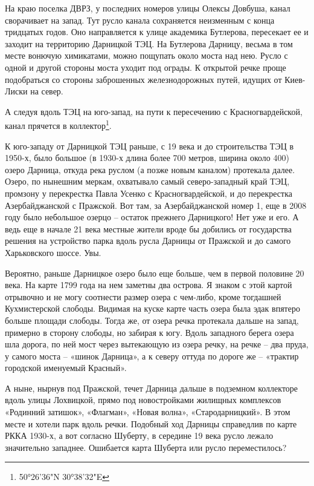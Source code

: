 
На краю поселка ДВРЗ, у последних номеров улицы Олексы Довбуша, канал сворачивает на запад. Тут русло канала сохраняется неизменным с конца тридцатых годов. Оно направляется к улице академика Бутлерова, пересекает ее и заходит на территорию Дарницкой ТЭЦ. На Бутлерова Дарницу, весьма в том месте вонючую химикатами, можно пощупать около моста над нею. Русло с одной и другой стороны моста уходит под ограды. К открытой речке проще подобраться со стороны заброшенных железнодорожных путей, идущих от Киев-Лиски на север.

А следуя вдоль ТЭЦ на юго-запад, на пути к пересечению с Красногвардейской, канал прячется в коллектор\footnote{50°26'36"N 30°38'32"E}.

К юго-западу от Дарницкой ТЭЦ раньше, с 19 века и до строительства ТЭЦ в 1950-х, было большое (в 1930-х длина более 700 метров, ширина около 400) озеро Дарница, откуда река руслом (а позже новым каналом) протекала далее. Озеро, по нынешним меркам, охватывало самый северо-западный край ТЭЦ, промзону у перекрестка Павла Усенко с Красногвардейской, и до перекрестка Азербайджанской с Пражской. Вот там, за Азербайджанской номер 1, еще в 2008 году было небольшое озерцо – остаток прежнего Дарницкого! Нет уже и его. А ведь еще в начале 21 века местные жители вроде бы добились от государства решения на устройство парка вдоль русла Дарницы от Пражской и до самого Харьковского шоссе. Увы.

Вероятно, раньше Дарницкое озеро было еще больше, чем в первой половине 20 века. На карте 1799 года на нем заметны два острова. Я знаком с этой картой отрывочно и не могу соотнести размер озера с чем-либо, кроме тогдашней Кухмистерской слободы. Видимая на куске карте часть озера была эдак впятеро больше площади слободы. Тогда же, от озера речка протекала дальше на запад, примерно в сторону слободы, но забирая к югу. Вдоль западного берега озера шла дорога, по ней мост через вытекающую из озера речку, на речке – два пруда, у самого моста – «шинок Дарница», а к северу оттуда по дороге же – «трактир городской именуемый Красный».

А ныне, нырнув под Пражской, течет Дарница дальше в подземном коллекторе вдоль улицы Лохвицкой, прямо под новостройками жилищных комплексов «Родинний затишок», «Флагман», «Новая волна», «Стародарницкий». В этом месте и хотели парк вдоль речки. Подобный ход Дарницы справедлив по карте РККА 1930-х, а вот согласно Шуберту, в середине 19 века русло лежало значительно западнее. Ошибается карта Шуберта или русло переместилось?

